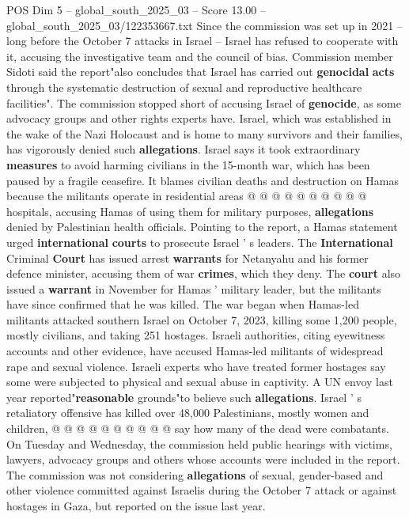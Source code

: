 \begin{textsample}{POS Dim 5 – global\_south\_2025\_03 – Score 13.00 – global\_south\_2025\_03/122353667.txt}
Since the commission was set up in 2021 -- long before the October 7 attacks in Israel -- Israel has refused to cooperate with it, accusing the investigative team and the council of bias.
Commission member Sidoti said the report"also concludes that Israel has carried out \textbf{genocidal} \textbf{acts} through the systematic destruction of sexual and reproductive healthcare facilities".
The commission stopped short of accusing Israel of \textbf{genocide}, as some advocacy groups and other rights experts have.
Israel, which was established in the wake of the Nazi Holocaust and is home to many survivors and their families, has vigorously denied such \textbf{allegations}.
Israel says it took extraordinary \textbf{measures} to avoid harming civilians in the 15-month war, which has been paused by a fragile ceasefire.
It blames civilian deaths and destruction on Hamas because the militants operate in residential areas @ @ @ @ @ @ @ @ @ @ hospitals, accusing Hamas of using them for military purposes, \textbf{allegations} denied by Palestinian health officials.
Pointing to the report, a Hamas statement urged \textbf{international} \textbf{courts} to prosecute Israel ' s leaders.
The \textbf{International} Criminal \textbf{Court} has issued arrest \textbf{warrants} for Netanyahu and his former defence minister, accusing them of war \textbf{crimes}, which they deny.
The \textbf{court} also issued a \textbf{warrant} in November for Hamas ' military leader, but the militants have since confirmed that he was killed.
The war began when Hamas-led militants attacked southern Israel on October 7, 2023, killing some 1,200 people, mostly civilians, and taking 251 hostages.
Israeli authorities, citing eyewitness accounts and other evidence, have accused Hamas-led militants of widespread rape and sexual violence.
Israeli experts who have treated former hostages say some were subjected to physical and sexual abuse in captivity.
A UN envoy last year reported"\textbf{reasonable} grounds"to believe such \textbf{allegations}.
Israel ' s retaliatory offensive has killed over 48,000 Palestinians, mostly women and children, @ @ @ @ @ @ @ @ @ @ say how many of the dead were combatants.
On Tuesday and Wednesday, the commission held public hearings with victims, lawyers, advocacy groups and others whose accounts were included in the report.
The commission was not considering \textbf{allegations} of sexual, gender-based and other violence committed against Israelis during the October 7 attack or against hostages in Gaza, but reported on the issue last year.

\end{textsample}
